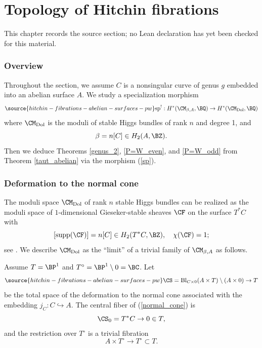 \chapter{Topology of Hitchin fibrations}
\label{hitchin-fibrations-abelian-surfaces-pw-chapter-07}

\begin{remark}
\label{hitchin-fibrations-abelian-surfaces-pw-chapter-07-source}
This chapter records the source section; no Lean declaration has yet been checked for this material.
\notready
\end{remark}

\subsection{Overview} Throughout the section, we assume $C$ is a nonsingular curve of genus $g$ embedded into an abelian surface $A$. We study a specialization morphism
\begin{equation}\label{sp}
\source{hitchin-fibrations-abelian-surfaces-pw}
    \mathrm{sp}^!: H^*(\CM_{\beta, A}, \BQ) \to H^*(\CM_{\mathrm{Dol}}, \BQ)
\end{equation}
where $\CM_{\mathrm{Dol}}$ is the moduli of stable Higgs bundles of rank $n$ and degree 1, and
\[
\beta = n[C] \in H_2(A, \BZ).
\]
Then we deduce Theorems \ref{genus_2}, \ref{P=W_even}, and \ref{P=W_odd} from Theorem \ref{taut_abelian} via the morphism (\ref{sp}).

\subsection{Deformation to the normal cone}\label{Section 4.2}

The moduli space $\CM_{\mathrm{Dol}}$ of rank $n$ stable Higgs bundles can be realized as the moduli space of $1$-dimensional Gieseker-stable sheaves $\CF$ on the surface $T^*C$ with
\[
 [\mathrm{supp}(\CF)] = n[C] \in H_2(T^*C, \BZ), \quad \chi(\CF) = 1;
\]
see \cite{BNR}. We describe $\CM_{\mathrm{Dol}}$ as the ``limit'' of a trivial family of $\CM_{\beta,A}$ as follows.

Assume $T = \BP^1$ and $T^\circ = \BP^1 \setminus 0 = \BC$. Let
\begin{equation}\label{normal_cone}
\source{hitchin-fibrations-abelian-surfaces-pw}
 \CS = \mathrm{Bl}_{C\times 0}(A \times T) \setminus (A\times 0) \to T
\end{equation}
be the total space of the deformation to the normal cone associated with the embedding $j_C:C\hookrightarrow A$. The central fiber of (\ref{normal_cone}) is
\[
\CS_0 = T^*C \to 0 \in T,
\]
and the restriction over $T^\circ$ is a trivial fibration
\[
A \times T^\circ \to  T^\circ \subset T.
\]


